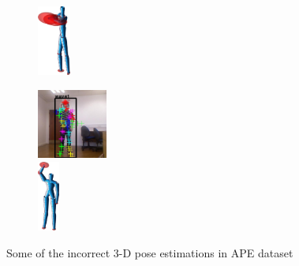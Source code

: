\begin{figure}
\begin{subfigure}[t]{0.18\linewidth}
		\includegraphics[height=2.3cm]{fig/body/APE/boxerr2.png} 
		\label{fig/body/APEerr3}
	\end{subfigure}
	\begin{subfigure}[t]{0.18\linewidth} \centering
		\includegraphics[height=2.3cm]{fig/body/APE/wave1err.jpg} \\
		\includegraphics[height=2.3cm]{fig/body/APE/wave1err.png} 
		\label{fig/body/APEerr4}
	\end{subfigure}
	\label{fig/body/APEerr}
	\caption{Some of the incorrect 3-D pose estimations in APE dataset}
\end{figure}
